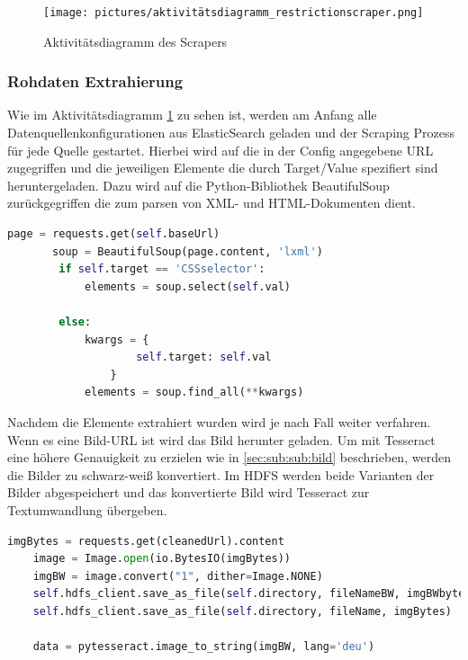 \documentclass[12pt,oneside,a4paper,parskip]{scrbook}
\begin{document}
\begin{figure}[H]
\caption{Aktivitätsdiagramm des Scrapers}
\label{activityRestriction}
\centering
\texttt{[image: pictures/aktivitätsdiagramm\_restrictionscraper.png]}
\end{figure} 

\subsubsection{Rohdaten Extrahierung}\label{sec:sub:sub:rohdaten}

Wie im Aktivitätsdiagramm \cref{activityRestriction} zu sehen ist, werden am Anfang alle Datenquellenkonfigurationen aus ElasticSearch geladen und der Scraping Prozess für jede Quelle gestartet. Hierbei wird auf die in der Config angegebene URL zugegriffen und die jeweiligen Elemente die durch Target/Value spezifiert sind heruntergeladen. Dazu wird auf die Python-Bibliothek BeautifulSoup zurückgegriffen die zum parsen von XML- und HTML-Dokumenten dient. 

\begin{lstlisting}[caption=Parsen und filtern der Website, language=Python]
	page = requests.get(self.baseUrl)
       soup = BeautifulSoup(page.content, 'lxml')	
        if self.target == 'CSSselector':
            elements = soup.select(self.val)

        else:
            kwargs = {
                    self.target: self.val
                }
            elements = soup.find_all(**kwargs)
\end{lstlisting}

Nachdem die Elemente extrahiert wurden wird je nach Fall weiter verfahren. Wenn es eine Bild-URL ist wird das Bild herunter geladen. Um mit Tesseract eine höhere Genauigkeit zu erzielen wie in \cref{sec:sub:sub:bild} beschrieben, werden die Bilder zu schwarz-weiß konvertiert. Im HDFS werden beide Varianten der Bilder abgespeichert und das konvertierte Bild wird Tesseract zur Textumwandlung übergeben. 

\begin{lstlisting}[caption=Schwarz-weiß Konvertierung, language=Python]
	imgBytes = requests.get(cleanedUrl).content
	image = Image.open(io.BytesIO(imgBytes))
	imgBW = image.convert("1", dither=Image.NONE)
	self.hdfs_client.save_as_file(self.directory, fileNameBW, imgBWbytes)
	self.hdfs_client.save_as_file(self.directory, fileName, imgBytes)

	data = pytesseract.image_to_string(imgBW, lang='deu') 
\end{lstlisting}
\end{document}
